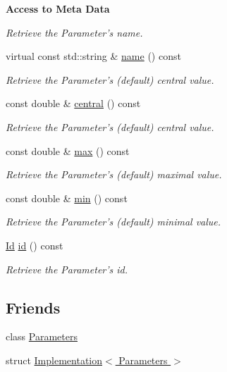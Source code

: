 \begin{Indent}{\bf Access to Meta Data}\par
{\em \label{_amgrpa3a190e9d66c82f98a9d3e29998edf0d}
 Retrieve the Parameter's name. }\begin{DoxyCompactItemize}
\item 
virtual const std::string \& \hyperlink{classeos_1_1Parameter_a86f581847722de0445ae65065940fd13}{name} () const 
\begin{DoxyCompactList}\small\item\em Retrieve the Parameter's (default) central value. \item\end{DoxyCompactList}\item 
const double \& \hyperlink{classeos_1_1Parameter_a1c0a1ce478f2275d1259483fa919ec60}{central} () const 
\begin{DoxyCompactList}\small\item\em Retrieve the Parameter's (default) central value. \item\end{DoxyCompactList}\item 
const double \& \hyperlink{classeos_1_1Parameter_ac91f5116794dea955ad7ac20e552b730}{max} () const 
\begin{DoxyCompactList}\small\item\em Retrieve the Parameter's (default) maximal value. \item\end{DoxyCompactList}\item 
const double \& \hyperlink{classeos_1_1Parameter_a37672fa03693d97cdafb23e35fe0e83b}{min} () const 
\begin{DoxyCompactList}\small\item\em Retrieve the Parameter's (default) minimal value. \item\end{DoxyCompactList}\item 
\hyperlink{classeos_1_1Parameter_a065f55e66b2128cc5f14339e676d833a}{Id} \hyperlink{classeos_1_1Parameter_a1cea65462fdafeb7329f6d87fd6e42b4}{id} () const 
\begin{DoxyCompactList}\small\item\em Retrieve the Parameter's id. \item\end{DoxyCompactList}\end{DoxyCompactItemize}
\end{Indent}
\subsection*{Friends}
\begin{DoxyCompactItemize}
\item 
class \hyperlink{classeos_1_1Parameter_afaebbd8ef883afa59f01fa3d4475e6a2}{Parameters}
\item 
struct \hyperlink{classeos_1_1Parameter_afdc1ae1c3b0dbac4fdf6769d5f8e1fbf}{Implementation$<$ Parameters $>$}
\end{DoxyCompactItemize}
